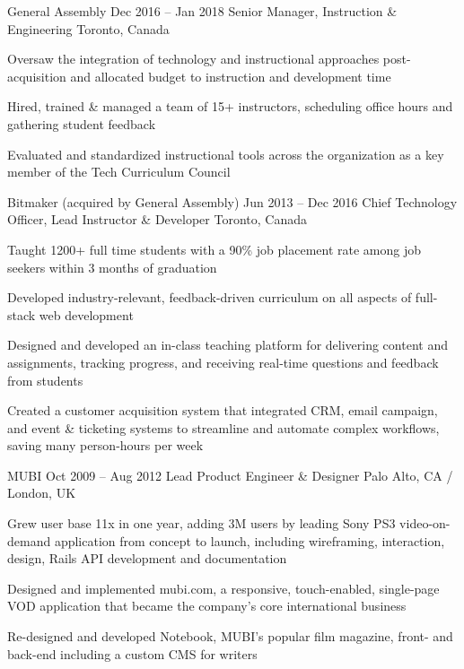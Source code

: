 \documentclass[10pt]{article}
\begin{document}
{	\job
	{General Assembly}
	{Dec 2016 – Jan 2018}
	{Senior Manager, Instruction \& Engineering}
	{Toronto, Canada}
	{\begin{newitemize}
		\item {Oversaw the integration of technology and instructional approaches post-acquisition and allocated budget to instruction and development time}
		\item {Hired, trained \& managed a team of 15+ instructors, scheduling office hours and gathering student feedback}
		\item {Evaluated and standardized instructional tools across the organization as a key member of the Tech Curriculum Council}
		\end{newitemize}}
	\pagebreak
	\job
	{Bitmaker (acquired by General Assembly)}
	{Jun 2013 – Dec 2016}
	{Chief Technology Officer, Lead Instructor \& Developer}
	{Toronto, Canada}
	{\begin{newitemize}
		\item {Taught 1200+ full time students with a 90\% job placement rate among job seekers within 3 months of graduation}
		\item {Developed industry-relevant, feedback-driven curriculum on all aspects of full-stack web development}
		\item {Designed and developed an in-class teaching platform for delivering content and assignments, tracking progress, and receiving real-time questions and feedback from students}
		\item {Created a customer acquisition system that integrated CRM, email campaign, and event \& ticketing systems to streamline and automate complex workflows, saving many person-hours per week}
		\end{newitemize}}
	\job
	{MUBI}
	{Oct 2009 – Aug 2012}
	{Lead Product Engineer \& Designer}
	{Palo Alto, CA / London, UK}
	{\begin{newitemize}
		\item {Grew user base 11x in one year, adding 3M users by leading Sony PS3 video-on-demand application from concept to launch, including wireframing, interaction, design, Rails API development and documentation}
		\item {Designed and implemented mubi.com, a responsive, touch-enabled, single-page VOD application that became the company’s core international business}
		\item {Re-designed and developed Notebook, MUBI’s popular film magazine, front- and back-end including a custom CMS for writers}
		\end{newitemize}}
}
\end{document}
